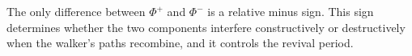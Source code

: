 The only difference between $\Phi^+$ and $\Phi^-$ is a relative minus
sign. This sign determines whether the two components interfere
constructively or destructively when the walker's paths recombine, and
it controls the revival period.
